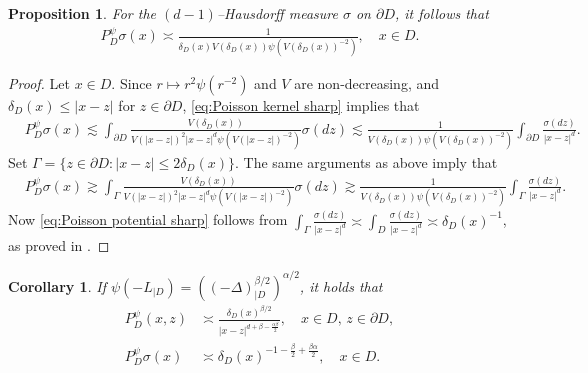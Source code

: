 \documentclass[12pt,a4paper,onecolumn]{article}
\newtheorem{prop}[thm]{Proposition}
\newtheorem{cor}[thm]{Corollary}
\theoremstyle{definition}
\newcommand{\1}{\mathbf 1}
\newcommand{\de}{\delta_D}
\newcommand{\Lo}{\psi(-L_{|D})}
\newcommand{\INTFR}{\left((-\Delta)^{\beta/2}_{|D}\right)^{\alpha/2}}
\newcommand{\PDS}{P^{\psi}_{ D}}
\numberwithin{equation}{section}
\begin{document}
    
	\begin{prop}\label{p:poisson bndry and finiteness}
	For the $(d-1)$--Hausdorff measure $\sigma$ on $\partial D$, it follows that
		\begin{align}\label{eq:Poisson potential sharp}
			\PDS \sigma(x)\asymp \frac{1}{\de(x) V(\de(x)) \psi(V(\de(x))^{-2})},\quad x\in D.
		\end{align}
	\end{prop}
	\begin{proof} 
    	Let $x\in D$. Since $r\mapsto r^2\psi(r^{-2})$ and $V$ are non-decreasing, and $\delta_D(x)\le |x-z|$ for $z\in\partial D$,  \eqref{eq:Poisson kernel sharp} implies that
		\begin{align*}
			&\PDS\sigma(x)\lesssim \int_{\partial D}\frac{V(\de(x))}{V(|x-z|)^2|x-z|^d\psi(V(|x-z|)^{-2})}\sigma(dz)\lesssim\frac{1}{V(\de(x))\psi(V(\de(x))^{-2})}\int_{\partial D} \frac{\sigma(dz)}{|x-z|^d}.
		\end{align*}
		Set $\Gamma=\{z\in\partial D: |x-z|\le 2\de(x)\}$. The same arguments as above imply that
		\begin{align*}
			&\PDS\sigma(x)\gtrsim \int_{\Gamma}\frac{V(\de(x))}{V(|x-z|)^2|x-z|^d\psi(V(|x-z|)^{-2})}\sigma(dz)\gtrsim\frac{1}{V(\de(x))\psi(V(\de(x))^{-2})}\int_{\Gamma} \frac{\sigma(dz)}{|x-z|^d}.
		\end{align*}
		Now \eqref{eq:Poisson potential sharp} follows from  $\int_{\Gamma}\frac{\sigma(dz)}{|x-z|^d}\asymp\int_{D} \frac{\sigma(dz)}{|x-z|^d}\asymp \de(x)^{-1}$, as proved in \cite[Lemma A.2]{Bio23cpaa}.
	\end{proof}

        \begin{cor}\label{c:PDS-inter-sharp}
            If $\Lo =\INTFR$, it holds that
            \begin{align*}
            	\PDS(x,z)&\asymp \frac{\de(x)^{\beta/2}}{|x-z|^{d+\beta-\frac{\alpha\beta}{2}}},\quad x\in D,\, z\in \partial D,\\
            	\PDS\sigma(x)&\asymp \de(x)^{-1-\frac\beta2+\frac{\beta\alpha}2},\quad x\in D.
            \end{align*} 
        \end{cor}
	
\end{document}

